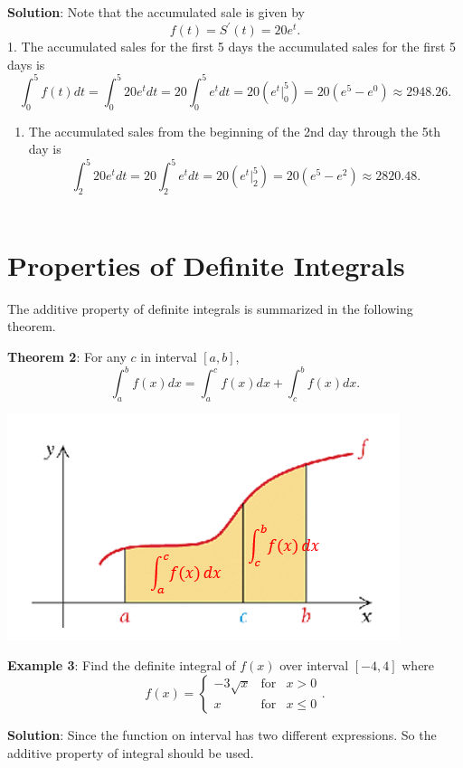 \documentclass[
]{book}
\providecommand{\tightlist}{%
  \setlength{\itemsep}{0pt}\setlength{\parskip}{0pt}}
\begin{document}
\textbf{Solution}: Note that the accumulated sale is given by
\[
f(t) = S^\prime(t) = 20e^t.
\]
1. The accumulated sales for the first 5 days the accumulated sales for the first 5 days is
\[
\int_0^5f(t)dt = \int_0^5 20e^t dt = 20\int_0^5 e^t dt = 20\left(e^t \Big|_0^5\right) = 20(e^5 - e^0) \approx 2948.26.
\]

\begin{enumerate}
\def\labelenumi{\arabic{enumi}.}
\setcounter{enumi}{1}
\tightlist
\item
  The accumulated sales from the beginning of the 2nd day through the 5th day is
  \[
  \int_2^5 20e^t dt = 20 \int_2^5e^t dt = 20\left(e^t\Big|_2^5\right) = 20(e^5 - e^2) \approx 2820.48.
  \]\\
\end{enumerate}

\hypertarget{properties-of-definite-integrals}{%
\section{Properties of Definite Integrals}\label{properties-of-definite-integrals}}

The additive property of definite integrals is summarized in the following theorem.

\textbf{Theorem 2}: For any \(c\) in interval \([a, b]\),
\[
\int_a^b f(x) dx = \int_a^c f(x) dx + \int_c^b f(x) dx.
\]

\begin{center}\includegraphics[width=0.45\linewidth]{img12/AdditiveRuleofItegral} \end{center}

\textbf{Example 3}: Find the definite integral of \(f(x)\) over interval \([-4, 4]\) where
\[
f(x) = \left\{
\begin{array}{lcl}
-3\sqrt{x} & \text{for} & x > 0 \\
x  & \text{for} & x \le 0
\end{array}.
\right.
\]

\textbf{Solution}: Since the function on interval has two different expressions. So the additive property of integral should be used.
\end{document}
